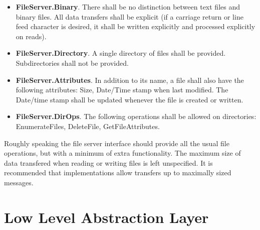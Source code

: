 \begin{itemize}
\item \textbf{FileServer.Binary}. There shall be no distinction between text files and binary
  files. All data transfers shall be explicit (if a carriage return or line feed character is
  desired, it shall be written explicitly and processed explicitly on reads).
\item \textbf{FileServer.Directory}. A single directory of files shall be provided.
  Subdirectories shall not be provided.
\item \textbf{FileServer.Attributes}. In addition to its name, a file shall also have the
  following attributes: Size, Date/Time stamp when last modified. The Date/time stamp shall be
  updated whenever the file is created or written.
\item \textbf{FileServer.DirOps}. The following operations shall be allowed on directories:
  EnumerateFiles, DeleteFile, GetFileAttributes.
\end{itemize}

Roughly speaking the file server interface should provide all the usual file operations, but
with a minimum of extra functionality. The maximum size of data transfered when reading or
writing files is left unspecified. It is recommended that implementations allow transfers up to
maximally sized messages.


\section{Low Level Abstraction Layer}
\label{sec:llal}

